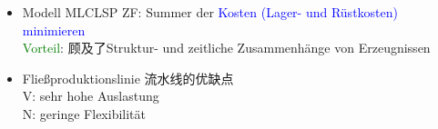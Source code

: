 \documentclass[12pt, letterpaper]{article}
\begin{document}
\begin{CJK*}{UTF8}{gbsn}
\begin{itemize}
\item Modell MLCLSP
ZF: Summer der \textcolor{blue}{Kosten (Lager- und Rüstkosten) minimieren}\\[1mm]
\textcolor{green}{Vorteil}: 顾及了Struktur- und zeitliche Zusammenhänge von Erzeugnissen

\item Fließproduktionslinie 流水线的优缺点\\[1mm]
V: sehr hohe Auslastung\\[1mm]
N: geringe Flexibilität

\end{itemize}



\end{CJK*}
\end{document}
